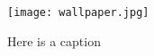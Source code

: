 \begin{figure}[H]
    \centering
    \texttt{[image: wallpaper.jpg]}
    \caption{Here is a caption}
\end{figure}
